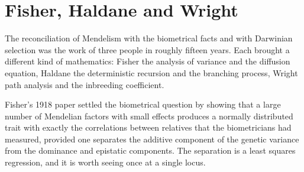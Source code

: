 \section{Fisher, Haldane and Wright}

The reconciliation of Mendelism with the biometrical facts and with Darwinian selection was the
work of three people in roughly fifteen years. Each brought a different kind of mathematics:
Fisher the analysis of variance and the diffusion equation, Haldane the deterministic recursion and
the branching process, Wright path analysis and the inbreeding coefficient.

Fisher's 1918 paper settled the biometrical question by showing that a large number of Mendelian
factors with small effects produces a normally distributed trait with exactly the correlations
between relatives that the biometricians had measured, provided one separates the additive
component of the genetic variance from the dominance and epistatic components. The separation is a
least squares regression, and it is worth seeing once at a single locus.

